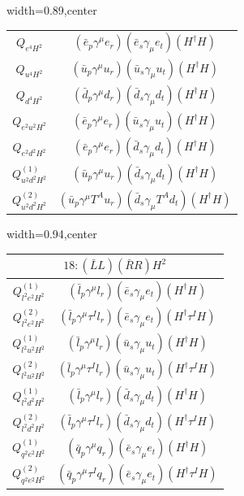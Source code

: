 \begin{table}[H]
\begin{center}
\begin{adjustbox}{width=0.89\textwidth,center}
\begin{minipage}[t]{5.9cm}
\begin{tabular}[t]{c|c}
\hline
$Q_{e^4H^2}$  &  $(\bar e_p \gamma^\mu e_r) (\bar e_s \gamma_\mu e_t) (H^\dag H)$ \\
%
$Q_{u^4H^2}$  &  $(\bar u_p \gamma^\mu u_r) (\bar u_s \gamma_\mu u_t) (H^\dag H)$ \\
%
$Q_{d^4H^2}$  &  $(\bar d_p \gamma^\mu d_r) (\bar d_s \gamma_\mu d_t) (H^\dag H)$ \\
%
$Q_{e^2u^2H^2}$  &  $(\bar e_p \gamma^\mu e_r) (\bar u_s \gamma_\mu u_t) (H^\dag H)$ \\
%
$Q_{e^2d^2H^2}$  &  $(\bar e_p \gamma^\mu e_r) (\bar d_s\gamma_\mu d_t) (H^\dag H)$ \\
%
$Q_{u^2d^2H^2}^{(1)}$  &  $(\bar u_p \gamma^\mu u_r) (\bar d_s \gamma_\mu d_t) (H^\dag H)$ \\
%
$Q_{u^2d^2H^2}^{(2)}$  &  $(\bar u_p \gamma^\mu T^A u_r) (\bar d_s \gamma_\mu T^A d_t) (H^\dag H)$
\end{tabular}
\end{minipage}
\end{adjustbox}
\begin{adjustbox}{width=0.94\textwidth,center}
\small
\begin{minipage}[t]{6.9cm}
\renewcommand{\arraystretch}{1.5}
\begin{tabular}[t]{c|c}
\multicolumn{2}{c}{\boldmath$18:(\bar L L)(\bar R R)H^2$} \\
\hline
$Q_{l^2e^2H^2}^{(1)}$  &  $(\bar l_p \gamma^\mu l_r) (\bar e_s \gamma_\mu e_t) (H^\dag H)$ \\
%
$Q_{l^2e^2H^2}^{(2)}$  &  $(\bar l_p \gamma^\mu \tau^I l_r) (\bar e_s \gamma_\mu e_t) (H^\dag \tau^I H)$ \\
%
$Q_{l^2u^2H^2}^{(1)}$  &  $(\bar l_p \gamma^\mu l_r) (\bar u_s \gamma_\mu u_t) (H^\dag H)$ \\
%
$Q_{l^2u^2H^2}^{(2)}$  &  $(\bar l_p \gamma^\mu \tau^I l_r) (\bar u_s \gamma_\mu u_t) (H^\dag \tau^I H)$ \\
%
$Q_{l^2d^2H^2}^{(1)}$  &  $(\bar l_p \gamma^\mu l_r) (\bar d_s \gamma_\mu d_t) (H^\dag H)$ \\
%
$Q_{l^2d^2H^2}^{(2)}$  &  $(\bar l_p \gamma^\mu \tau^I l_r) (\bar d_s \gamma_\mu d_t) (H^\dag \tau^I H)$ \\
%
$Q_{q^2e^2H^2}^{(1)}$  &  $(\bar q_p \gamma^\mu q_r) (\bar e_s \gamma_\mu e_t) (H^\dag H)$ \\
%
$Q_{q^2e^2H^2}^{(2)}$  &  $(\bar q_p \gamma^\mu \tau^I q_r) (\bar e_s \gamma_\mu e_t) (H^\dag \tau^I H)$ \\

\end{tabular}
\end{minipage}
\end{adjustbox}
\end{center}
\end{table}
